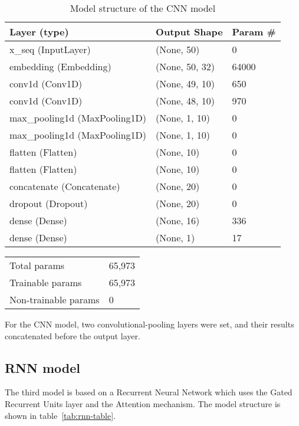 \documentclass[runningheads]{llncs}
\begin{document}
\begin{table}
\centering
\begin{tabular}{|l|l|l|}
\hline
\rowcolor[HTML]{C0C0C0} 
\textbf{Layer (type)} & \textbf{Output Shape} & \textbf{Param \#} \\ \hline
x\_seq (InputLayer) & (None, 50) & 0 \\ \hline
embedding (Embedding) & (None, 50, 32) & 64000 \\ \hline
conv1d (Conv1D) & (None, 49, 10) & 650 \\ \hline
conv1d (Conv1D) & (None, 48, 10) & 970 \\ \hline
max\_pooling1d (MaxPooling1D) & (None, 1, 10) & 0 \\ \hline
max\_pooling1d (MaxPooling1D) & (None, 1, 10) & 0 \\ \hline
flatten (Flatten) & (None, 10) & 0 \\ \hline
flatten (Flatten) & (None, 10) & 0 \\ \hline
concatenate (Concatenate) & (None, 20) & 0 \\ \hline
dropout (Dropout) & (None, 20) & 0 \\ \hline
dense (Dense) & (None, 16) & 336 \\ \hline
dense (Dense) & (None, 1) & 17 \\ \hline
\end{tabular}
\caption{Model structure of the CNN model}
\label{tab:cnn-table}
\end{table}

\begin{table}
\centering
\begin{tabular}{ll}
Total params & 65,973 \\
Trainable params & 65,973 \\
Non-trainable params & 0
\end{tabular}
\end{table}

For the CNN model, two convolutional-pooling layers were set, and their results concatenated before the output layer.

\subsection{RNN model}
The third model is based on a Recurrent Neural Network which uses the Gated Recurrent Units layer and the Attention mechanism. The model structure is shown in table~\ref{tab:rnn-table}.
\end{document}
